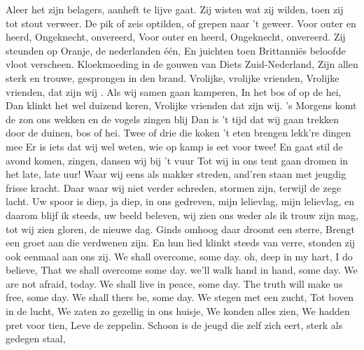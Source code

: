 \documentclass{article}
\begin{document}
\begin{songs}{}
Aleer het zijn belagers, aanheft te lijve gaat.
Zij wisten wat zij wilden, toen zij tot stout verweer. 
De pik of zeis optilden, of grepen naar 't geweer.
\endverse
\beginchorus
Voor outer en heerd,
Ongeknecht, onvereerd,
Voor outer en heerd,
Ongeknecht, onvereerd.
\endchorus
\beginverse*
Zij steunden op Oranje, de nederlanden één,
En juichten toen Brittanniës beloofde vloot verscheen.
Kloekmoeding in de gouwen van Diets Zuid-Nederland,
Zijn allen sterk en trouwe, gesprongen in den brand.
\endverse
\endsong
{}
\beginchorus
Vrolijke, vrolijke vrienden,
Vrolijke vrienden, dat zijn wij .
\endchorus
\beginverse*
Als wij samen gaan kamperen,
In het bos of op de hei,
Dan klinkt het wel duizend keren,
Vrolijke vrienden dat zijn wij. 
\endverse
\beginverse*
's Morgens komt de zon ons wekken
en de vogels zingen blij
Dan is 't tijd dat wij gaan trekken
door de duinen, bos of hei. 
\endverse
\beginverse*
Twee of drie die koken 't eten
brengen lekk're dingen mee
Er is iets dat wij wel weten,
wie op kamp is eet voor twee! 
\endverse
\beginverse*
En gaat stil de avond komen,
zingen, dansen wij bij 't vuur
Tot wij in ons tent gaan dromen
in het late, late uur!
\endverse
\endsong
{}
\beginverse*
Waar wij eens als makker streden,
and’ren staan met jeugdig frisse kracht.
Daar waar wij niet verder schreden,
stormen zijn, terwijl de zege lacht.
\endverse
\beginchorus
Uw spoor is diep, ja diep,
in ons gedreven,
mijn lelievlag, mijn lelievlag,
en daarom blijf ik steeds,
uw beeld beleven,
wij zien ons weder als ik trouw zijn mag,
tot wij zien gloren, de nieuwe dag.
\endchorus
\beginverse*
Ginds omhoog daar droomt een sterre,
Brengt een groet aan die verdwenen zijn.
En hun lied klinkt steeds van verre,
stonden zij ook eenmaal aan ons zij.
\endverse
\endsong
{}
\beginverse
We shall overcome,  some day.
oh, deep in my hart, I do believe,
That we shall overcome some day.
\endverse
\beginverse
we'll walk hand in hand,  some day.
\endverse
\beginverse
We are not afraid,  today.
\endverse
\beginverse
We shall live in peace,  some day.
\endverse
\beginverse
The truth will make us free, some day.
\endverse
\beginverse
We shall thers be,  some day.
\endverse
\endsong
{}
\beginverse*
We stegen met een zucht,
Tot boven in de lucht,
We zaten zo gezellig in ons huisje,
We konden alles zien,
We hadden pret voor tien,
Leve de zeppelin.
\endverse
\endsong
{}
\beginverse*
Schoon is de jeugd die zelf zich eert, sterk als gedegen staal,

\end{songs}
\end{document}
